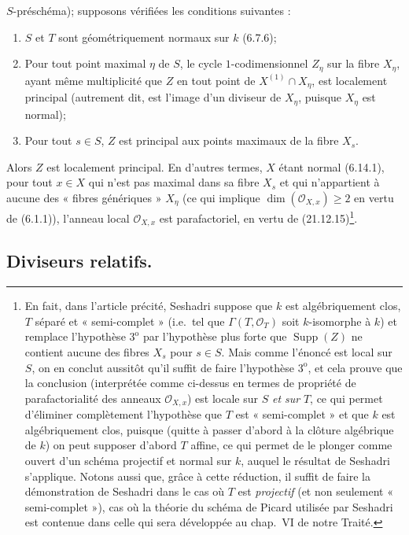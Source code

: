 \begin{env}[21.14.4]
$S$-préschéma); supposons vérifiées les conditions suivantes :
\begin{enumerate}[label=\arabic*\textsuperscript{o}]
  \item $S$ et $T$ sont géométriquement normaux sur $k$ (6.7.6);
  \item Pour tout point maximal $\eta$ de $S$, le cycle $1$-codimensionnel $Z_\eta$
  sur la fibre $X_\eta$, ayant même multiplicité que $Z$ en tout point de
  $X^{(1)}\cap X_\eta$, est localement principal (autrement dit, est l'image d'un
  diviseur de $X_\eta$, puisque $X_\eta$ est normal);
  \item Pour tout $s\in S$, $Z$ est principal aux points maximaux de la fibre $X_s$.
\end{enumerate}

Alors $Z$ est localement principal. En d'autres termes, $X$ étant normal (6.14.1),
pour tout $x\in X$ qui n'est pas maximal dans sa fibre $X_s$ et qui n'appartient à
aucune des « fibres génériques » $X_\eta$ (ce qui implique
$\dim(\mathcal O_{X,x})\geq2$ en vertu de (6.1.1)), l'anneau local
$\mathcal O_{X,x}$ est parafactoriel, en vertu de (21.12.15)\footnote{En fait, dans l'article précité, Seshadri suppose que $k$ est algébriquement
clos, $T$ séparé et « semi-complet » (i.e.\ tel que
$\Gamma(T,\mathcal O_T)$ soit $k$-isomorphe à $k$) et remplace l'hypothèse
$3^{\mathrm o}$ par l'hypothèse plus forte que $\operatorname{Supp}(Z)$ ne contient
aucune des fibres $X_s$ pour $s\in S$. Mais comme l'énoncé est local sur $S$, on en
conclut aussitôt qu'il suffit de faire l'hypothèse $3^{\mathrm o}$, et cela prouve que
la conclusion (interprétée comme ci-dessus en termes de propriété de parafactorialité
des anneaux $\mathcal O_{X,x}$) est locale sur $S$ \emph{et sur} $T$, ce qui permet
d'éliminer complètement l'hypothèse que $T$ est « semi-complet » et que $k$ est
algébriquement clos, puisque (quitte à passer d'abord à la clôture algébrique de $k$)
on peut supposer d'abord $T$ affine, ce qui permet de le plonger comme ouvert d'un
schéma projectif et normal sur $k$, auquel le résultat de Seshadri s'applique. Notons
aussi que, grâce à cette réduction, il suffit de faire la démonstration de Seshadri dans
le cas où $T$ est \emph{projectif} (et non seulement « semi-complet »), cas où la
théorie du schéma de Picard utilisée par Seshadri est contenue dans celle qui sera
développée au chap.~VI de notre Traité.}.
\end{env}

\subsection{Diviseurs relatifs.}
\label{IV.21.15}

